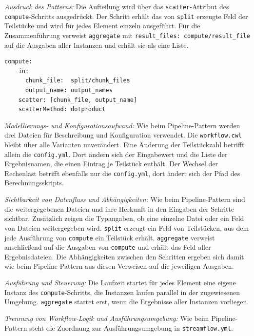 \emph{Ausdruck des Patterns:} Die Aufteilung wird über das
\texttt{scatter}-Attribut des \texttt{compute}-Schritts ausgedrückt.
Der Schritt erhält das von \texttt{split} erzeugte Feld der
Teilstücke und wird für jedes Element einzeln ausgeführt.
Für die Zusammenführung verweist \texttt{aggregate} mit
\texttt{result\_files: compute/result\_file} auf die Ausgaben aller
Instanzen und erhält sie als eine Liste.

\begin{lstlisting}[caption={Fan-out über scatter am compute-Schritt (StreamFlow, Scatter-Gather)},label={lst:sg:sf}]
  compute:
    in:
      chunk_file:  split/chunk_files
      output_name: output_names
    scatter: [chunk_file, output_name]
    scatterMethod: dotproduct
\end{lstlisting}

\emph{Modellierungs- und Konfigurationsaufwand:} Wie beim
Pipeline-Pattern werden drei Dateien für Beschreibung und
Konfiguration verwendet. Die \texttt{workflow.cwl} bleibt über alle
Varianten unverändert. Eine Änderung der Teilstückzahl betrifft allein
die \texttt{config.yml}. Dort ändern sich der Eingabewert und die
Liste der Ergebnisnamen, die einen Eintrag je Teilstück enthält. Der
Wechsel der Rechenlast betrifft ebenfalls nur die
\texttt{config.yml}, dort ändert sich der Pfad des
Berechnungsskripts.

\emph{Sichtbarkeit von Datenfluss und Abhängigkeiten:} Wie beim
Pipeline-Pattern sind die weitergegebenen Dateien und ihre Herkunft
in den Eingaben der Schritte sichtbar. Zusätzlich zeigen die
Typangaben, ob eine einzelne Datei oder ein Feld von Dateien
weitergegeben wird. \texttt{split} erzeugt ein Feld von Teilstücken,
aus dem jede Ausführung von \texttt{compute} ein Teilstück erhält.
\texttt{aggregate} verweist anschließend auf die Ausgaben von
\texttt{compute} und erhält das Feld aller Ergebnisdateien. Die
Abhängigkeiten zwischen den Schritten ergeben sich damit wie beim
Pipeline-Pattern aus diesen Verweisen auf die jeweiligen Ausgaben.

\emph{Ausführung und Steuerung:} Die Laufzeit startet für jedes
Element eine eigene Instanz des \texttt{compute}-Schritts, die
Instanzen laufen parallel in der zugewiesenen Umgebung.
\texttt{aggregate} startet erst, wenn die Ergebnisse aller Instanzen
vorliegen.

\emph{Trennung von Workflow-Logik und Ausführungsumgebung:} Wie beim
Pipeline-Pattern steht die Zuordnung zur Ausführungsumgebung in
\texttt{streamflow.yml}.


